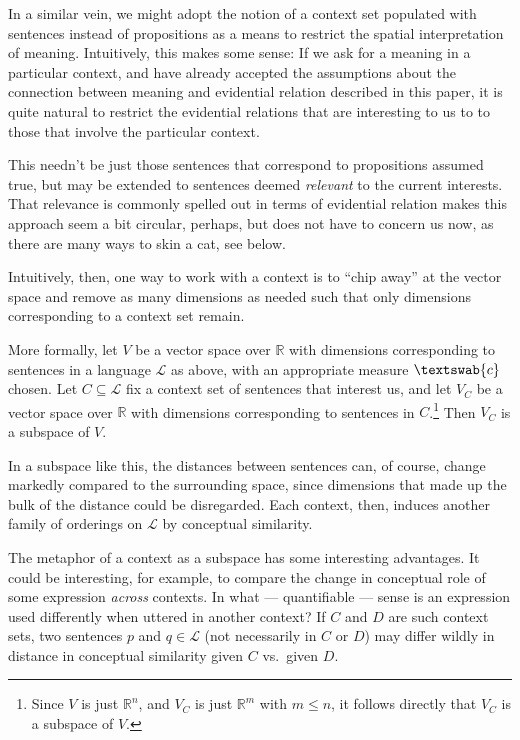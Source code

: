 \documentclass[11pt, a4paper]{scrartcl}
\renewcommand{\i}[1]{\emph{#1}}
\renewcommand{\L}{\mathcal{L}}
\newcommand{\m}[1]{\textswab{#1}}
\begin{document}
In a similar vein, we might adopt the notion of a context set populated with sentences instead of propositions as a means to restrict the spatial interpretation of meaning. Intuitively, this makes some sense: If we ask for a meaning in a particular context, and have already accepted the assumptions about the connection between meaning and evidential relation described in this paper, it is quite natural to restrict the evidential relations that are interesting to us to to those that involve the particular context.

This needn't be just those sentences that correspond to propositions assumed true, but may be extended to sentences deemed \i{relevant} to the current interests. That relevance is commonly spelled out in terms of evidential relation makes this approach seem a bit circular, perhaps, but does not have to concern us now, as there are many ways to skin a cat, see below.

Intuitively, then, one way to work with a context is to ``chip away'' at the vector space and remove as many dimensions as needed such that only dimensions corresponding to a context set remain.

More formally, let $V$ be a vector space over $\mathbb{R}$ with dimensions corresponding to sentences in a language $\L$ as above, with an appropriate measure $\m{c}$ chosen. Let $C \subseteq \L$ fix a context set of sentences that interest us, and let $V_C$ be a vector space over $\mathbb{R}$ with dimensions corresponding to sentences in $C$.\footnote{Since $V$ is just $\mathbb{R}^n$, and $V_C$ is just $\mathbb{R}^m$ with $m \leqslant n$, it follows directly that $V_C$ is a subspace of $V$.} Then $V_C$ is a subspace of $V$.

In a subspace like this, the distances between sentences can, of course, change markedly compared to the surrounding space, since dimensions that made up the bulk of the distance could be disregarded. Each context, then, induces another family of orderings on $\L$ by conceptual similarity.

The metaphor of a context as a subspace has some interesting advantages. It could be interesting, for example, to compare the change in conceptual role of some expression \i{across} contexts. In what --- quantifiable --- sense is an expression used differently when uttered in another context? If $C$ and $D$ are such context sets, two sentences $p$ and $q \in \L$  (not necessarily in $C$ or $D$) may differ wildly in distance in conceptual similarity given $C$ vs.\ given $D$. 
\end{document}
